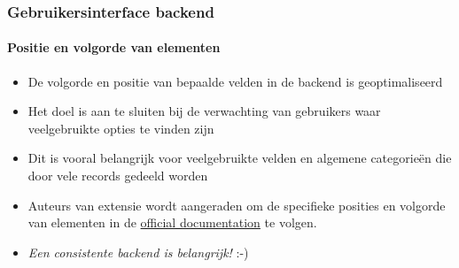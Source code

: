 \begin{frame}[fragile]
	\frametitle{Gebruikersinterface backend}
	\framesubtitle{Positie en volgorde van elementen}

	\begin{itemize}
		\item De volgorde en positie van bepaalde velden in de backend is geoptimaliseerd
		\item Het doel is aan te sluiten bij de verwachting van gebruikers waar veelgebruikte opties te vinden zijn
		\item Dit is vooral belangrijk voor veelgebruikte velden en algemene categorieën die door vele records gedeeld worden
		\item Auteurs van extensie wordt aangeraden om de specifieke posities en volgorde van elementen in
		 	de \href{https://docs.typo3.org}{official documentation} te volgen.


	\end{itemize}

	\begin{itemize}
		\item \textit{Een consistente backend is belangrijk!} :-)
	\end{itemize}

\end{frame}

